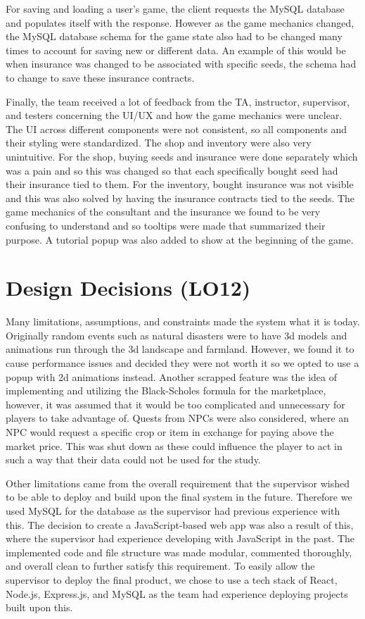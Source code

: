 \documentclass{article}
\begin{document}
For saving and loading a user's game, the client requests the MySQL database and populates itself with the response. However as the game mechanics changed, the MySQL database schema for the game state also had to be changed many times to account for saving new or different data. An example of this would be when insurance was changed to be associated with specific seeds, the schema had to change to save these insurance contracts.

Finally, the team received a lot of feedback from the TA, instructor, supervisor, and testers concerning the UI/UX and how the game mechanics were unclear. The UI across different components were not consistent, so all components and their styling were standardized. The shop and inventory were also very unintuitive. For the shop, buying seeds and insurance were done separately which was a pain and so this was changed so that each specifically bought seed had their insurance tied to them. For the inventory, bought insurance was not visible and this was also solved by having the insurance contracts tied to the seeds. The game mechanics of the consultant and the insurance we found to be very confusing to understand and so tooltips were made that summarized their purpose. A tutorial popup was also added to show at the beginning of the game.

\section{Design Decisions (LO12)}
Many limitations, assumptions, and constraints made the system what it is today. Originally random events such as natural disasters were to have 3d models and animations run through the 3d landscape and farmland. However, we found it to cause performance issues and decided they were not worth it so we opted to use a popup with 2d animations instead. Another scrapped feature was the idea of implementing and utilizing the Black-Scholes formula for the marketplace, however, it was assumed that it would be too complicated and unnecessary for players to take advantage of. Quests from NPCs were also considered, where an NPC would request a specific crop or item in exchange for paying above the market price. This was shut down as these could influence the player to act in such a way that their data could not be used for the study.

Other limitations came from the overall requirement that the supervisor wished to be able to deploy and build upon the final system in the future. Therefore we used MySQL for the database as the supervisor had previous experience with this. The decision to create a JavaScript-based web app was also a result of this, where the supervisor had experience developing with JavaScript in the past. The implemented code and file structure was made modular, commented thoroughly, and overall clean to further satisfy this requirement. To easily allow the supervisor to deploy the final product, we chose to use a tech stack of React, Node.js, Express.js, and MySQL as the team had experience deploying projects built upon this.
\end{document}
